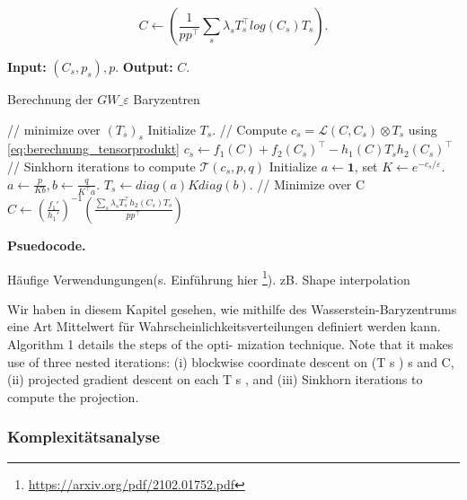 \documentclass[11pt,a4paper]{article}
\numberwithin{equation}{section}
\begin{document}
	\begin{equation}
	C \leftarrow \left(\frac{1}{pp^\top}\sum_s{\lambda_s T_s^\top log(C_s)T_s}\right).
	\end{equation}
	\begin{algorithm}
		\hspace*{\algorithmicindent} \textbf{Input: } $(C_s,p_s), p.$ \newline
		\hspace*{\algorithmicindent} \textbf{Output: } $C$. 
		\caption{Berechnung der $GW\_{\varepsilon}$ Baryzentren}
		\label{alg:GWB_computation}
		\begin{algorithmic}
		\REPEAT 
			\STATE// minimize over $(T_s)_s$
				\STATE Initialize $T_s$.
				\REPEAT
				\STATE // Compute $c_s = \mathcal{L}(C,C_s)\otimes T_s$ using \autoref*{eq:berechnung_tensorprodukt}
				\STATE $c_s \leftarrow f_1(C) + f_2(C_s)^\top -h_1(C)T_sh_2(C_s)^\top$
				\STATE // Sinkhorn iterations to compute $\mathcal{T}(c_s,p,q)$
				\STATE Initialize $a \leftarrow \boldsymbol{1}$, set $K \leftarrow e^{-c_s/\varepsilon}.$
				\REPEAT 
				\STATE $a \leftarrow \frac{p}{Kb}, b \leftarrow  \frac{q}{K^\top a}.$
		 		\STATE $T_s \leftarrow diag(a)Kdiag(b).$
			\ENDFOR 
			\STATE // Minimize over C 
			\STATE $C \leftarrow \left( \frac{f_1'}{h_1'} \right)^{-1}\left( \frac{\sum_s{\lambda_sT_s^\top h_2(C_s)T_s}}{pp^\top} \right)$ 
		\end{algorithmic}
	\end{algorithm}
	
	\noindent \textbf{Psuedocode.}
	
	Häufige Verwendungungen(s. Einführung hier \footnote{\url{https://arxiv.org/pdf/2102.01752.pdf}}). zB. Shape interpolation
	
	Wir haben in diesem Kapitel gesehen, wie mithilfe des Wasserstein-Baryzentrums eine Art Mittelwert für Wahrscheinlichkeitsverteilungen definiert werden kann.\\
	Algorithm 1 details the steps of the opti-
	mization technique. Note that it makes use of three nested
	iterations: (i) blockwise coordinate descent on (T s ) s and
	C, (ii) projected gradient descent on each T s , and (iii)
	Sinkhorn iterations to compute the projection.
	\subsubsection{Komplexitätsanalyse}
	
\end{document}
